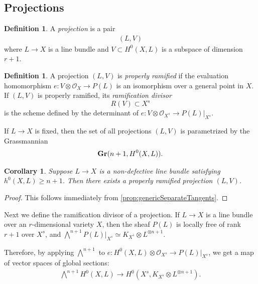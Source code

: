\documentclass[11pt,reqno]{amsart}
\theoremstyle{plain}
\newtheorem{corollary}[theorem]{Corollary}
\theoremstyle{definition}
\newtheorem{definition}[theorem]{Definition}
\theoremstyle{remark}
\numberwithin{equation}{section}
\newcommand{\cO}{{\mathcal O}}
\renewcommand{\to}{{\longrightarrow}}
\numberwithin{equation}{section}
\begin{document}
\subsection{Projections}

\begin{definition}
A {\sl projection} is a pair 
\begin{align*}
  (L,V)
\end{align*}
where  $L \to X$ is a line bundle and $V \subset H^{0}(X,L)$ is a subspace of dimension $r+1$.  
\end{definition}

\begin{definition}
  \label{definition:properlyramified}
  A projection $(L,V)$ is {\sl properly ramified} if the evaluation homomorphism $e: V \otimes \cO_{X} \to P(L)$ is an isomorphism over a general point in $X$.  If $(L,V)$ is properly ramified, its {\sl ramification divisor} $$R(V) \subset X^{s}$$ is the scheme defined by the determinant of $e : V \otimes \cO_{X^{s}} \to P(L)|_{X^{s}}$.
\end{definition}

If $L \to X$ is fixed, then the set of all projections $(L,V)$ is parametrized by the Grassmannian 
\begin{align*}
  {\bf Gr}(n+1, H^{0}(X,L)).
\end{align*}

\begin{corollary}\label{cor:properlyramified}
  Suppose $L \to X$ is a non-defective line bundle  satisfying $h^{0}(X,L) \geq n+1$. Then there exists a properly ramified projection $(L,V)$.
\end{corollary}

\begin{proof}
  This follows immediately from \autoref{prop:genericSeparateTangents}.
\end{proof}

Next we define the ramification divisor of a projection.  If $L \to X$ is a line bundle over an $r$-dimensional variety $X$, then the sheaf $P(L)$ is locally free of rank $r+1$ over $X^{s}$, and $\bigwedge^{n+1}P(L)|_{X^{s}} \simeq K_{X^{s}} \otimes L^{\otimes n+1}$.  

Therefore, by applying $\bigwedge^{n+1}$ to $e : H^{0}(X,L) \otimes \cO_{X^{s}} \to P(L)|_{X^{s}}$, we get a map of vector spaces of global sections: 
\begin{align}\label{vectorspacemap}
\bigwedge^{n+1}H^{0}(X,L) \to H^{0}(X^{s},K_{X^{s}} \otimes L^{\otimes n+1}).
\end{align}
\end{document}
